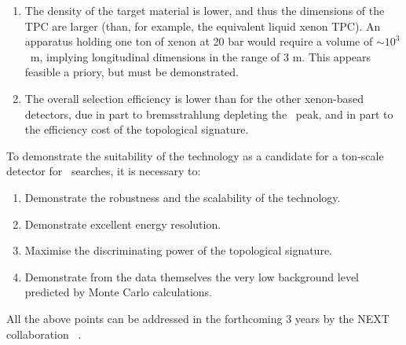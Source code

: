 \begin{enumerate}
\item  The density of the target material is lower, and thus the dimensions of the TPC are larger (than, for example, the equivalent liquid xenon TPC). An apparatus holding one ton of xenon at 20 bar would require a volume of $\sim 10^3$~m, implying longitudinal dimensions in the range of 3 m. This appears feasible a priory, but must be demonstrated.
\item  The overall selection efficiency is lower than for the other xenon-based detectors, due in part to bremsstrahlung depleting the \Qbb\ peak, and in part to the efficiency cost of the topological signature. 
\end{enumerate}

To demonstrate the suitability of the technology as a candidate for a ton-scale detector for \bbonu\ searches, it is necessary to:

\begin{enumerate}
\item Demonstrate the robustness and the scalability of the technology.
\item Demonstrate excellent energy resolution.
\item Maximise the discriminating power of the topological signature.
\item Demonstrate from the data themselves the very low background level predicted by Monte Carlo calculations. 
\end{enumerate}

All the above points can be addressed in the forthcoming 3 years by the NEXT collaboration~
 \cite{Granena:2009it,Alvarez:2012sma,Gomez-Cadenas:2014dxa}.
%
%
